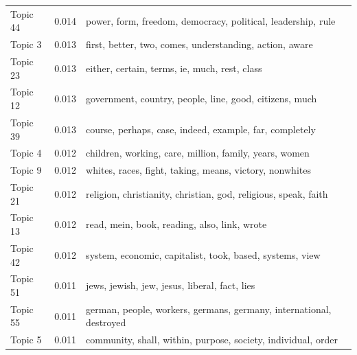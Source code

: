 \documentclass[12pt]{paper}
\begin{document}
\begin{table}[H]
\begin{adjustbox}{width=1\textwidth}
\begin{tabular}{lll}
	Topic 44                           & 0.014                                                  & power, form, freedom, democracy, political, leadership, rule        \\
	Topic 3                            & 0.013                                                  & first, better, two, comes, understanding, action, aware             \\
	Topic 23                           & 0.013                                                  & either, certain, terms, ie, much, rest, class                       \\
	Topic 12                           & 0.013                                                  & government, country, people, line, good, citizens, much             \\
	Topic 39                           & 0.013                                                  & course, perhaps, case, indeed, example, far, completely             \\
	Topic 4                            & 0.012                                                  & children, working, care, million, family, years, women              \\
	Topic 9                            & 0.012                                                  & whites, races, fight, taking, means, victory, nonwhites             \\
	Topic 21                           & 0.012                                                  & religion, christianity, christian, god, religious, speak, faith     \\
	Topic 13                           & 0.012                                                  & read, mein, book, reading, also, link, wrote                        \\
	Topic 42                           & 0.012                                                  & system, economic, capitalist, took, based, systems, view            \\
	Topic 51                           & 0.011                                                  & jews, jewish, jew, jesus, liberal, fact, lies                       \\
	Topic 55                           & 0.011                                                  & german, people, workers, germans, germany, international, destroyed \\
	Topic 5                            & 0.011                                                  & community, shall, within, purpose, society, individual, order       \\

\end{tabular}
\end{adjustbox}
\end{table}
\end{document}
